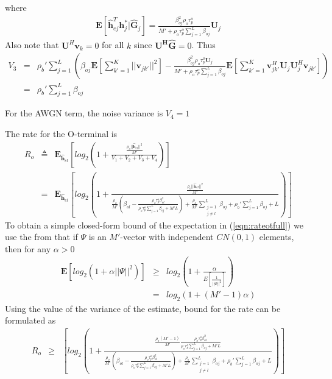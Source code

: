 \documentclass[10pt, a4paper, twoside,fleqn]{article}
\begin{document}
where
\begin{eqnarray}
	\pmb{E}[\pmb{\hat h}_{ej}^T \pmb{h}_j^*| \pmb{\hat G}_{j}] = \frac{\beta_{oj}^{2}\rho_o\tau_p^o}{M'+\rho_o\tau_p^o\sum\limits_{j=1}^{L}\beta_{oj}}\pmb{U}_j
\end{eqnarray}
Also note that $\pmb{U}^H\pmb{v}_k=0$ for all $k$ since $\pmb{U^H}\pmb{\hat G}=0$. Thus
\begin{eqnarray}\label{eqn:otv3}
	V_3 &=& \rho_b' \sum_{j=1}^{L} \left( \beta_{oj} \pmb{E}\left[\sum_{k'=1}^{K}||\pmb{v}_{jk'}||^2\right]
					- \frac{\beta_{oj}^{2}\rho_o\tau_p^o\pmb{U}_j}{M'+\rho_o\tau_p^o\sum\limits_{j=1}^{L}\beta_{oj}} \pmb{E}\left[\sum_{k'=1}^{K} \pmb{v}_{jk'}^H \pmb{U}_j \pmb{U}_j^H \pmb{v}_{jk'}\right]\right) \nonumber \\
	    &=& \rho_b'\sum_{j=1}^{L}\beta_{oj}
\end{eqnarray}

For the AWGN term, the noise variance is $V_4 = 1$

The rate for the O-terminal is
\begin{eqnarray}\label{eqn:rateotfull}
	R_o &\triangleq& \pmb{E}_{\pmb{\hat h}_{el}}\left[log_2\left(1+\frac{\frac{\rho_o||\pmb{\hat h}_{el}||^2}{M'}}{V_1+V_2+V_3+V_4}\right) \right] \nonumber \\
            &=&  \pmb{E}_{\pmb{\hat h}_{el}}\left[log_2\left(1+\frac{\frac{\rho_o||\pmb{\hat h}_{el}||^2}{M'}}
								 {\frac{\rho_o}{M'}(\beta_{ol}-\frac{\rho_o\tau_p^o\beta^2_{ol}}{\rho_o\tau_p^o\sum\limits_{j=1}^{L}\beta_{oj}+M'L})        
								  + \frac{\rho_o}{M'} \sum\limits_{\substack{j=1 \\ j\neq l}}^{L} \beta_{oj} 
								  +\rho_b'\sum\limits_{j=1}^{L}\beta_{oj}
								  +L}\right) \right]	
\end{eqnarray}
To obtain a simple closed-form bound of the expectation in (\ref{eqn:rateotfull}) we use the from \cite{bib:dtsysBook} that if $\Psi$ is an $M'$-vector with independent $CN(0,1)$ elements, then for any $\alpha>0$
\begin{eqnarray}\label{eqn:bound}
	\pmb{E}[log_2(1+\alpha||\Psi||^2)] &\geq& log_2\left(1+\frac{\alpha}{E[\frac{1}{||\Psi||^2}]}\right) \nonumber \\
                                              &=&  log_2(1+(M'-1)\alpha)
\end{eqnarray}
Using the value of the variance of the estimate, bound for the rate can be formulated as
\begin{eqnarray}
	R_o &\geq& \left[log_2\left(1+\frac{\frac{\rho_o(M'-1)}{M'}\frac{\rho_o\tau_p^o\beta^2_{ol}}{\rho_o\tau_p^o\sum\limits_{j=1}^{L}\beta_{oj}+M'L}}
								 {\frac{\rho_o}{M'}(\beta_{ol}-\frac{\rho_o\tau_p^o\beta^2_{ol}}{\rho_o\tau_p^o\sum\limits_{j=1}^{L}\beta_{oj}+M'L})        
								  + \frac{\rho_o}{M'} \sum\limits_{\substack{j=1 \\ j\neq l}}^{L} \beta_{oj} 
								  +\rho_b'\sum\limits_{j=1}^{L}\beta_{oj}
								  +L}\right) \right]	
\end{eqnarray}
\end{document}
